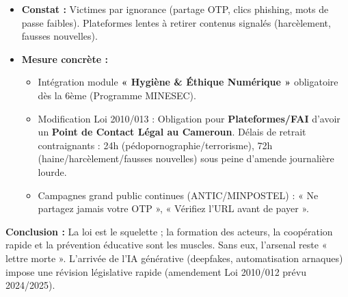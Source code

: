 \documentclass[11pt]{article}
\begin{document}
\begin{exoresolu}
\begin{enumerate}
              \begin{itemize}
                  \item \textbf{Constat :} Victimes par ignorance (partage OTP, clics phishing, mots de passe faibles). Plateformes lentes à retirer contenus signalés (harcèlement, fausses nouvelles).
                  \item \textbf{Mesure concrète :}
                        \begin{itemize}
                            \item Intégration module \textbf{« Hygiène \& Éthique Numérique »} obligatoire dès la 6ème (Programme MINESEC).
                            \item Modification Loi 2010/013 : Obligation pour \textbf{Plateformes/FAI} d'avoir un \textbf{Point de Contact Légal au Cameroun}. Délais de retrait contraignants : 24h (pédopornographie/terrorisme), 72h (haine/harcèlement/fausses nouvelles) sous peine d'amende journalière lourde.
                            \item Campagnes grand public continues (ANTIC/MINPOSTEL) : « Ne partagez jamais votre OTP », « Vérifiez l'URL avant de payer ».
                        \end{itemize}
              \end{itemize}
    \end{enumerate}
    \textbf{Conclusion :} La loi est le squelette ; la formation des acteurs, la coopération rapide et la prévention éducative sont les muscles. Sans eux, l'arsenal reste « lettre morte ». L'arrivée de l'IA générative (deepfakes, automatisation arnaques) impose une révision législative rapide (amendement Loi 2010/012 prévu 2024/2025).
\end{exoresolu}
\end{document}

